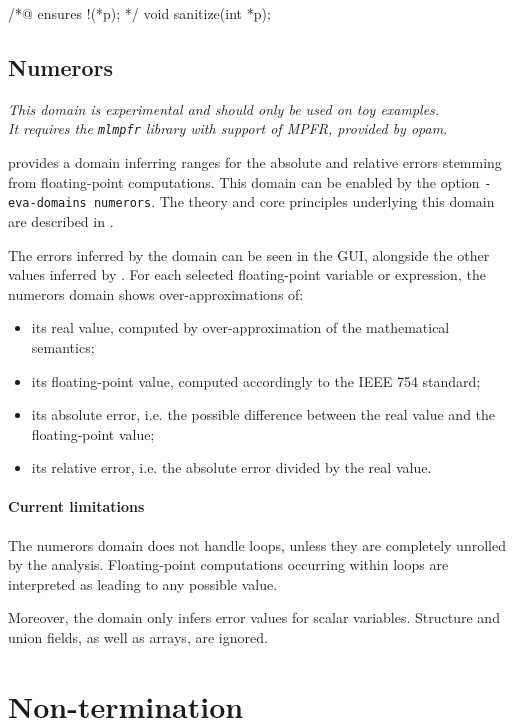 \documentclass{frama-c-book}
\begin{document}
\begin{listing-nonumber}
  /*@ ensures !\tainted(*p); */
  void sanitize(int *p);
\end{listing-nonumber}


\subsection{Numerors}
\label{sec:numerors}

\emph{This domain is experimental and should only be used on toy examples.\\
  It requires the \texttt{mlmpfr} library with support of MPFR,
  provided by opam.}

\Eva{} provides a domain inferring ranges for the absolute and relative errors
stemming from floating-point computations. This domain can be enabled by the
option \texttt{-eva-domains numerors}. The theory and core principles underlying
this domain are described in \cite{DBLP:conf/sas/JacqueminPV18}.

The errors inferred by the domain can be seen in the GUI, alongside the other
values inferred by \Eva{}.
For each selected floating-point variable or expression, the numerors domain
shows over-approximations of:
\begin{itemize}
\item its real value, computed by over-approximation of the mathematical
  semantics;
\item its floating-point value, computed accordingly to the IEEE 754 standard;
\item its absolute error, i.e. the possible difference between the real value
  and the floating-point value;
\item its relative error, i.e. the absolute error divided by the real value.
\end{itemize}

\paragraph{Current limitations}

The numerors domain does not handle loops, unless they are completely unrolled
by the analysis. Floating-point computations occurring within loops are
interpreted as leading to any possible value.

Moreover, the domain only infers error values for scalar variables. Structure
and union fields, as well as arrays, are ignored.

\section{Non-termination}\label{nonterm}
\end{document}

